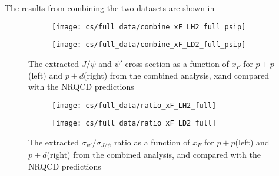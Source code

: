 \documentclass[../main.tex]{subfiles}
\begin{document}
The results from combining the two datasets are shown in 
\begin{table}[h!]
	\centering
	\caption{Cross section as a function of $x_F$ (in \unit{\nano\barn\per nucleon}) for $p+p$ extracted from run entire dataset, with their statistical and systematic uncertainties and the average $x_F$ in each bin.}
	
	\end{table}
\begin{table}[h!]
	\centering
	\caption{Cross section as a function of $x_F$ (in \unit{\nano\barn\per nucleon}) for $p+d$ extracted from entire dataset, with their statistical and systematic uncertainties and the average $x_F$ in each bin.}
	
\end{table}
\begin{figure}
\centering
	\begin{subfigure}{0.45\linewidth}
		\texttt{[image: cs/full\_data/combine\_xF\_LH2\_full\_psip]}
	\end{subfigure}
	\begin{subfigure}{0.45\linewidth}
		\texttt{[image: cs/full\_data/combine\_xF\_LD2\_full\_psip]}
	\end{subfigure}
	\caption{The extracted $J/\psi$ and $\psi'$ cross section as a function of $x_F$ for $p+p$(left)
		and $p+d$(right) from the combined analysis, xand compared with the NRQCD predictions}
\end{figure}
\begin{figure}
\centering
	\begin{subfigure}{0.45\linewidth}
		\texttt{[image: cs/full\_data/ratio\_xF\_LH2\_full]}
	\end{subfigure}
	\begin{subfigure}{0.45\linewidth}
		\texttt{[image: cs/full\_data/ratio\_xF\_LD2\_full]}
	\end{subfigure}
	\caption{The extracted  $\sigma_{\psi'}/\sigma_{J/\psi}$ ratio as a function of $x_F$ for $p+p$(left)
		and $p+d$(right) from the combined analysis, and compared with the NRQCD predictions}
\end{figure}


\end{document}
